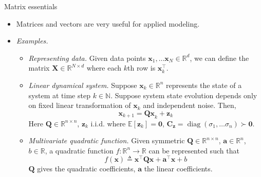 \documentclass{beamer}
\numberwithin{equation}{section}
\begin{document}
\begin{frame}{Matrix essentials}
    \begin{itemize}
        \item
        Matrices and vectors are very useful for applied modeling.

        \item
        \textit{Examples.}
        \begin{itemize}
            \item
            \textit{Representing data.} Given data points $ \mathbf{x}_1,
            \ldots \mathbf{x}_N \in \mathbb{R}^d $, we can define the matrix
            $ \mathbf{X} \in \mathbb{R}^{N \times d} $ where each $ k $th row
            is $ \mathbf{x}_k^\top $.

            \item
            \textit{Linear dynamical system.} Suppose $ \mathbf{x}_k \in
            \mathbb{R}^n $ represents the state of a system at time step
            $ k \in \mathbb{N} $. Suppose system state evolution depends only
            on fixed linear transformation of $ \mathbf{x}_k $ and
            independent noise. Then,
            \begin{equation*}
                \mathbf{x}_{k + 1} = \mathbf{Qx}_k + \mathbf{z}_k
            \end{equation*}
            Here $ \mathbf{Q} \in \mathbb{R}^{n \times n} $, $ \mathbf{z}_k $
            i.i.d. where $ \mathbb{E}[\mathbf{z}_k] = \mathbf{0} $,
            $ \mathbf{C}_\mathbf{z} = \operatorname{diag}(\sigma_1, \ldots
            \sigma_n) \succ \mathbf{0} $.

            \item
            \textit{Multivariate quadratic function.} Given symmetric
            $ \mathbf{Q} \in \mathbb{R}^{n \times n} $, $ \mathbf{a} \in
            \mathbb{R}^n $, $ b \in \mathbb{R} $, a quadratic function
            $ f : \mathbb{R}^n \rightarrow \mathbb{R} $ can be represented
            such that
            \begin{equation*}
                f(\mathbf{x}) \triangleq \mathbf{x}^\top\mathbf{Qx} +
                \mathbf{a}^\top\mathbf{x} + b
            \end{equation*}
            $ \mathbf{Q} $ gives the quadratic coefficients, $ \mathbf{a} $
            the linear coefficients.
        \end{itemize}
    \end{itemize}
\end{frame}
\end{document}
